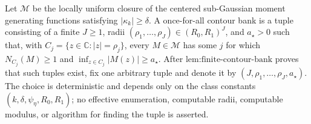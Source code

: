 Let \(\mathscr M\) be the locally uniform closure of the centered sub-Gaussian moment generating functions satisfying \(\lvert\kappa_k\rvert\ge\delta\).  A once-for-all contour bank is a tuple consisting of a finite \(J\ge1\), radii \((\rho_1,\ldots,\rho_J)\in(R_0,R_1)^J\), and \(a_{\star}>0\) such that, with \(C_j=\{z\in\mathbb C:|z|=\rho_j\}\), every \(M\in\mathscr M\) has some \(j\) for which \(N_{C_j}(M)\ge1\) and \(\inf_{z\in C_j}|M(z)|\ge a_{\star}\).  After \(\text{lem:finite-contour-bank}\) proves that such tuples exist, fix one arbitrary tuple and denote it by \((J,\rho_1,\ldots,\rho_J,a_{\star})\).  The choice is deterministic and depends only on the class constants \((k,\delta,\psi_{\eta},R_0,R_1)\); no effective enumeration, computable radii, computable modulus, or algorithm for finding the tuple is asserted.